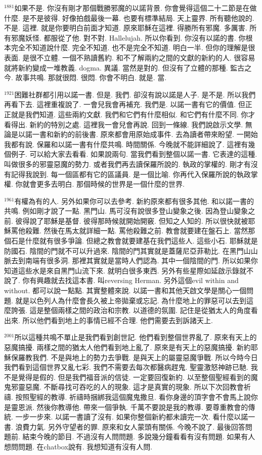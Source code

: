 \documentclass{book}
\begin{document}
$^{1881}$如果不是.
你沒有剛才那個戰勝邪魔的以諾背景.
你會覺得這個二十二節是在做什麼.
是不是彼得.
好像拍戲最後一幕.
也要有標準結局.
天上靈界.
所有聽他說的.
不是.
這裡.
就是你要明白前面才知道.
原來耶穌在這裡.
得勝所有邪魔.
多厲害.
所有邪魔妖怪.
都服從了他.
對不對.
Hallelujah.
所以你看到.
你沒有以諾的書.
你根本完全不知道說什麼.
完全不知道.
也不是完全不知道.
明白一半.
但你的理解是很表面.
是很不立體.
一個不熟讀舊約.
和不了解兩約之間的文獻的新約的人.
很容易就將新約變成一堆教義.
dogma.
異議.
當然是對的.
但沒有了立體的那種.
監古之今.
故事共鳴.
那就很悶.
很悶.
你會不明白.
就是.
當.

$^{1921}$困難社群都引用以諾一書.
但是.
我們.
卻沒有說以諾是人子.
是不是.
所以我們再看下去.
這裡重複說了.
一會兒我會再補充.
我們是.
以諾一書有它的價值.
但正正就是我們知道.
這些兩約文獻.
我們和它們有什麼相似.
和它們有什麼不同.
你才看得出.
新約的特別之處.
這裡我一會兒會再說.
回到一條線.
我們說啟示文學.
無論是以諾一書和新約的前後書.
原來都會用原始成事件.
去為讀者帶來盼望.
一開始我都有說.
保羅和以諾一書有什麼共鳴.
時間關係.
今晚就不能詳細說了.
這裡有幾個例子.
可以給大家去看看.
如果說兩句.
當我們看到整個以諾一書.
它表達的這種.
叫做很多的邪靈惡魔的勢力.
或者我們再去讀保羅所說的.
執政的掌權的.
剛才有沒有記得我說到.
每一個區都有它的區議員.
是一個比喻.
你再代入保羅所說的執政掌權.
你就會更多去明白.
那個時候的世界是一個什麼的世界.

$^{1961}$有權為有的人.
另外如果你可以去參考.
新約原來都有很多其他.
和以諾一書的共鳴.
例如剛才說了一點.
黑門山.
馬可沒有說很多登山變象之後.
因為登山變象之前.
彼得說了耶穌是基督.
彼得那時候就開始開竅.
但知之人知的.
所以很快就被耶穌罵他殺難.
然後在馬太就詳細一點.
罵他殺難之前.
教會就要建在盤石上.
當然那個石是什麼就有很多爭論.
但總之教會就要建基在我們這些人.
這些小石.
耶穌就是防國石.
陰間的門就不可以升過來.
陰間的門其實就是蓋薩尼亞菲勒比.
在黑門山山脈去到南端有很多洞.
那裡其實就是當時人們認為.
其中一個陰間的門.
所以如果你知道這些水是來自黑門山流下來.
就明白很多東西.
另外有些星際如延啟示錄就不說了.
你有興趣就去找這本書.
叫reversing Herman.
另外這個evil within and without.
都可以說一點點.
其實整體來說.
以諾一書和其他天啟文學是關心一個問題.
就是以色列人為什麼會長久被上帝拋棄或忘記.
為什麼地上的罪惡可以去到這麼誇張.
這是整個兩樣之間的政治和宗教.
以道德的氛圍.
記住是從猶太人的角度看出來.
所以他們看到地上的事情已經不合理.
他們需要去到訴諸天上.

$^{2001}$所以這種共鳴不單止是我們看到創世記.
他們看到整個世界亂了.
原來有天上的惡魔搞擾.
兩樣之間的猶太人他們看到地上亂了.
原來是有天上的惡魔搞擾.
新約耶穌保羅教我們.
不是與地上的勢力去爭戰.
是與天上的屬靈惡魔爭戰.
所以今時今日我們看到這個世界又亂七彩.
我們不需要去每次都醫病趕鬼.
聖靈激怒神跡已馳.
我不是覺得是假的.
但是我們福音派的信徒.
一定要回復新約.
以至整個聖經看到的魔鬼邪靈惡魔.
不斷尋找可吞吃的人的現象.
這才是真實的現象.
所以下次回教會祈禱.
按照聖經的教導.
祈禱時捆綁我這個魔鬼撒旦.
看你身邊的頂字會不會馬上說你是靈恩派.
然後你教導他.
帶來一個爭執.
千萬不要說是我的教導.
要尊重教會的傳統.
一步一步來.
以諾一書讀了沒有.
如果你整個新約都未讀完一次.
看什麼以諾一書.
浪費力氣.
另外守望者的罪.
原來和女人蒙頭有關係.
今晚不說了.
最後回答問題前.
結束今晚的節目.
不過沒有人問問題.
多說幾分鐘看看有沒有問題.
如果有人想問問題.
在chatbox說有.
我想知道有沒有人問.
\end{document}
